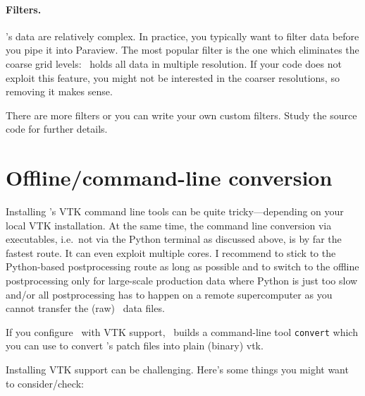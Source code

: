 \paragraph{Filters.}
%
%
%
\Peano's data are relatively complex.
In practice, you typically want to filter data before you pipe it into Paraview.
The most popular filter is the one which eliminates the coarse grid levels:
\Peano\ holds all data in multiple resolution.
If your code does not exploit this feature, you might not be interested in the 
coarser resolutions, so removing it makes sense.


There are more filters or you can write your own custom filters.
Study the source code for further details.



\section{Offline/command-line conversion}
\label{section:postprocessing:command-line}


Installing \Peano's VTK command line tools can be quite tricky---depending on your
local VTK installation.
At the same time, the command line conversion via executables, i.e.~not via the 
Python terminal as discussed above, is by far the fastest route.
It  can even exploit multiple cores.
I recommend to stick to the Python-based postprocessing route as long as possible 
and to switch to the offline postprocessing only for large-scale production data
where Python is just too slow and/or all postprocessing has to happen on a remote 
supercomputer as you cannot transfer the (raw) \Peano\ data files.


\begin{remark}
  If you configure \Peano\ with VTK support, \Peano\ builds a command-line tool
  \texttt{convert} which you can use to convert \Peano 's patch files into plain
  (binary) vtk.
\end{remark}



\noindent
Installing VTK support can be challenging. 
Here's some things you might want to consider/check:

